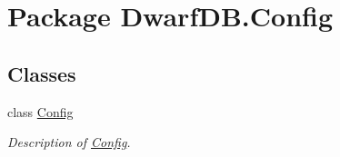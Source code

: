 \hypertarget{namespace_dwarf_d_b_1_1_config}{
\section{Package DwarfDB.Config}
\label{namespace_dwarf_d_b_1_1_config}
}
\subsection*{Classes}
\begin{DoxyCompactItemize}
\item 
class \hyperlink{class_dwarf_d_b_1_1_config_1_1_config}{Config}
\begin{DoxyCompactList}\small\item\em Description of \hyperlink{class_dwarf_d_b_1_1_config_1_1_config}{Config}. \item\end{DoxyCompactList}\end{DoxyCompactItemize}
